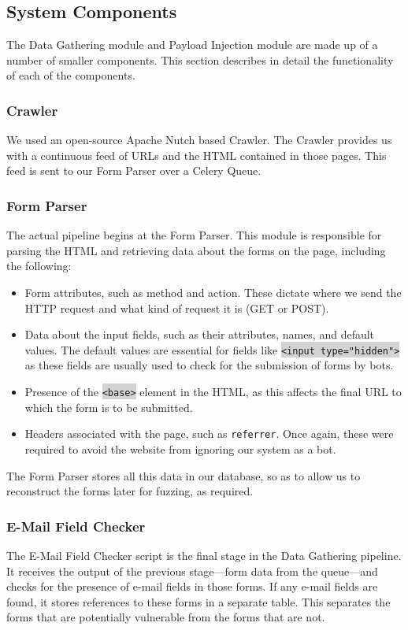 \subsection{System Components}
\label{Comp}

The Data Gathering module and Payload Injection module are made up of a number of smaller components. This section describes in detail the functionality of each of the components.

\subsubsection{Crawler}
\label{Comp:Crawler}
We used an open-source Apache Nutch based Crawler. The Crawler provides us with a continuous feed of URLs and the HTML contained in those pages. This feed is sent to our Form Parser over a Celery Queue.

\subsubsection{Form Parser}
\label{Comp:FP}
The actual pipeline begins at the Form Parser. This module is responsible for parsing the HTML and retrieving data about the forms on the page, including the following:
\begin{itemize}
	\item Form attributes, such as method and action. These dictate where we send the HTTP request and what kind of request it is (GET or POST).
	\item Data about the input fields, such as their attributes, names, and default values. The default values are essential for fields like \colorbox{lightgray}{\lstinline{<input type="hidden">}} as these fields are usually used to check for the submission of forms by bots.
	\item Presence of the \colorbox{lightgray}{\lstinline{<base>}} element in the HTML, as this affects the final URL to which the form is to be submitted.
	\item Headers associated with the page, such as \texttt{referrer}. Once again, these were required to avoid the website from ignoring our system as a bot.
\end{itemize} 
The Form Parser stores all this data in our database, so as to allow us to reconstruct the forms later for fuzzing, as required.

\subsubsection{E-Mail Field Checker}
\label{Comp:EMFC}
The E-Mail Field Checker script is the final stage in the Data Gathering pipeline. It receives the output of the previous stage---form data from the queue---and checks for the presence of e-mail fields in those forms. If any e-mail fields are found, it stores references to these forms in a separate table. This separates the forms that are potentially vulnerable from the forms that are not.

